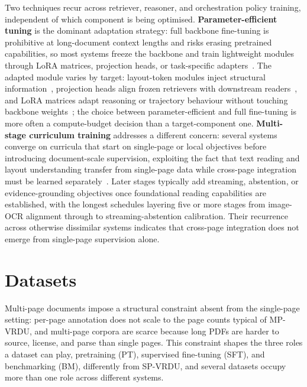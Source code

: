 Two techniques recur across retriever, reasoner, and orchestration policy training, independent of which component is being optimised. \textbf{Parameter-efficient tuning} is the dominant adaptation strategy: full backbone fine-tuning is prohibitive at long-document context lengths and risks erasing pretrained capabilities, so most systems freeze the backbone and train lightweight modules through LoRA matrices, projection heads, or task-specific adapters~\cite{zhu2025simple, zhang2024cream, qian2026accurate, zhang2026docdancer}. The adapted module varies by target: layout-token modules inject structural information~\cite{zhu2025simple}, projection heads align frozen retrievers with downstream readers~\cite{qian2026accurate}, and LoRA matrices adapt reasoning or trajectory behaviour without touching backbone weights~\cite{zhang2024cream, zhang2026docdancer}; the choice between parameter-efficient and full fine-tuning is more often a compute-budget decision than a target-component one. \textbf{Multi-stage curriculum training} addresses a different concern: several systems converge on curricula that start on single-page or local objectives before introducing document-scale supervision, exploiting the fact that text reading and layout understanding transfer from single-page data while cross-page integration must be learned separately~\cite{hu2025mplug, hannan2026docslm}. Later stages typically add streaming, abstention, or evidence-grounding objectives once foundational reading capabilities are established, with the longest schedules layering five or more stages from image-OCR alignment through to streaming-abstention calibration. Their recurrence across otherwise dissimilar systems indicates that cross-page integration does not emerge from single-page supervision alone.

\section{Datasets}
\label{sec:datasets}
Multi-page documents impose a structural constraint absent from the single-page setting: per-page annotation does not scale to the page counts typical of MP-VRDU, and multi-page corpora are scarce because long PDFs are harder to source, license, and parse than single pages. This constraint shapes the three roles a dataset can play, pretraining (PT), supervised fine-tuning (SFT), and benchmarking (BM), differently from SP-VRDU, and several datasets occupy more than one role across different systems.



